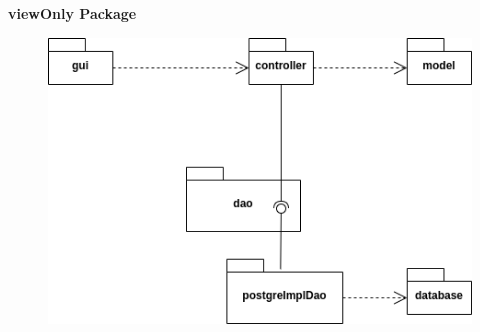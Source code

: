 \newpage

\begin{center}
	\textbf{viewOnly Package}
\end{center}

\begin{figure}[h]
	\includegraphics{res/DOC_OBJECT/onlyPackage.png}
\end{figure}






